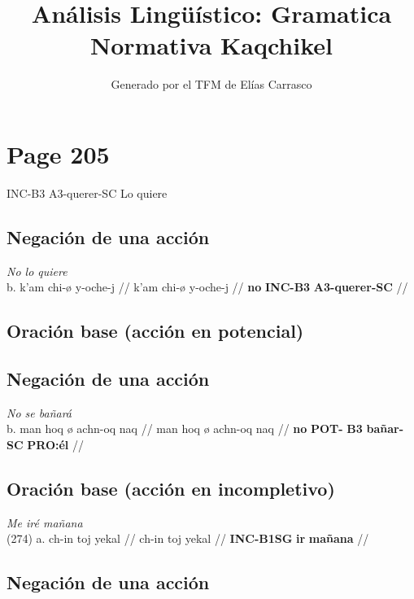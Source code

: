 \documentclass{article}%
\title{Análisis Lingüístico: Gramatica Normativa Kaqchikel}%
\author{Generado por el TFM de Elías Carrasco}%
\begin{document}
%
\normalsize%
\maketitle%
\section{Page 205}%
\label{sec:Page205}%
INC{-}B3 A3{-}querer{-}SC %
Lo quiere %
\subsection{Negación de una acción}%
\label{subsec:Negacindeunaaccin}%

%
\par\medskip%
\ex
\textit{No lo quiere} \\
\begingl
\gla b. k’am chi-ø y-oche-j //
\glb k’am chi-ø y-oche-j //
\glc \textbf{no} \textbf{INC-}\textbf{B3} \textbf{A3-}\textbf{querer-}\textbf{SC} //
\endgl
\xe
%
\medskip%
\subsection{Oración base (acción en potencial)}%
\label{subsec:Oracinbase(accinenpotencial)}%

%
\subsection{Negación de una acción}%
\label{subsec:Negacindeunaaccin}%

%
\par\medskip%
\ex
\textit{No se bañará} \\
\begingl
\gla b. man hoq ø achn-oq naq //
\glb man hoq ø achn-oq naq //
\glc \textbf{no} \textbf{POT-} \textbf{B3} \textbf{bañar-}\textbf{SC} \textbf{PRO:él} //
\endgl
\xe
%
\medskip%
\subsection{Oración base (acción en incompletivo)}%
\label{subsec:Oracinbase(accinenincompletivo)}%

%
\par\medskip%
\ex
\textit{Me iré mañana} \\
\begingl
\gla (274) a. ch-in toj yekal //
\glb ch-in toj yekal //
\glc \textbf{INC-}\textbf{B1SG} \textbf{ir} \textbf{mañana} //
\endgl
\xe
%
\medskip%
\subsection{Negación de una acción}%
\label{subsec:Negacindeunaaccin}%
\end{document}
